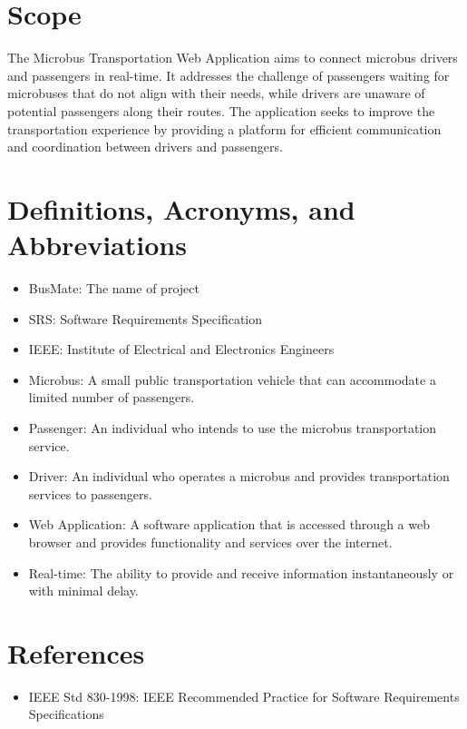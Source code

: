 \documentclass{BusMateSRS}
\def\projectName{BusMate}
\begin{document}
\section{Scope}
The Microbus Transportation Web Application aims to connect microbus drivers 
and passengers in real-time. 
It addresses the challenge of passengers waiting for microbuses that 
do not align with their needs, while drivers are unaware of potential 
passengers along their routes. 
The application seeks to improve the transportation experience by providing 
a platform for efficient communication and coordination between 
drivers and passengers.

\section{Definitions, Acronyms, and Abbreviations}
\begin{itemize}
  \item {\projectName}: 
    The name of project
  \item SRS: 
    Software Requirements Specification
  \item IEEE: 
    Institute of Electrical and Electronics Engineers
  \item Microbus: 
    A small public transportation vehicle that can accommodate 
    a limited number of passengers.
  \item Passenger:
    An individual who intends to use the microbus transportation service.
  \item Driver:
    An individual who operates a microbus and provides transportation 
    services to passengers.
  \item Web Application:
    A software application that is accessed through a web browser and provides 
    functionality and services over the internet.
  \item Real-time: The ability to provide and receive information 
    instantaneously or with minimal delay.
\end{itemize}

\section{References}
\begin{itemize}
  \item IEEE Std 830-1998: IEEE Recommended Practice for Software Requirements Specifications
\end{itemize}


\end{document}

